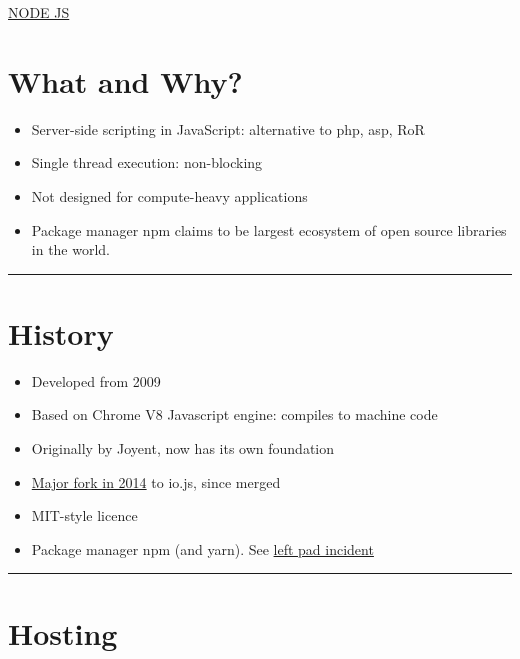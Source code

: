 \documentclass{article}[18pt]
\providecommand{\tightlist}{%
	\setlength{\itemsep}{0pt}\setlength{\parskip}{0pt}}
\begin{document}
\begin{center}
\underline{\huge NODE JS}
\end{center}

\hypertarget{what-and-why}{%
	\section{What and Why?}\label{what-and-why}}

\begin{itemize}
	\tightlist
	\item
	Server-side scripting in JavaScript: alternative to php, asp, RoR
	\item
	Single thread execution: non-blocking
	\item
	Not designed for compute-heavy applications
	\item
	Package manager npm claims to be largest ecosystem of open source
	libraries in the world.
\end{itemize}

\begin{center}\rule{0.5\linewidth}{\linethickness}\end{center}

\hypertarget{history}{%
	\section{History}\label{history}}

\begin{itemize}
	\tightlist
	\item
	Developed from 2009
	\item
	Based on Chrome V8 Javascript engine: compiles to machine code
	\item
	Originally by Joyent, now has its own foundation
	\item
	\href{https://flaviocopes.com/node-history/}{Major fork in 2014} to
	io.js, since merged
	\item
	MIT-style licence
	\item
	Package manager npm (and yarn). See
	\href{https://blog.npmjs.org/post/141577284765/kik-left-pad-and-npm}{left
		pad incident}
\end{itemize}

\begin{center}\rule{0.5\linewidth}{\linethickness}\end{center}

\hypertarget{hosting}{%
	\section{Hosting}\label{hosting}}
\end{document}
